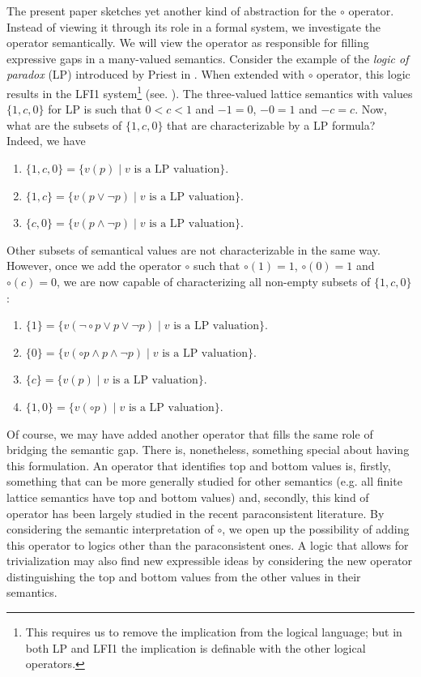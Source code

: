 \documentclass{amsart}
\begin{document}
The present paper sketches yet another kind of abstraction for the $\circ$ operator. Instead of viewing it through its role in a formal system, we investigate the operator semantically. We will view the operator as responsible for filling expressive gaps in a many-valued semantics.
Consider the example of the \textit{logic of paradox} (LP) introduced by Priest in \cite{priest_logic_1979}. When extended with $\circ$ operator, this logic results in the LFI1 system\footnote{This requires us to remove the implication from the logical language; but in both LP and LFI1 the implication is definable with the other logical operators.}  (see. \cite[p. 158-167]{carnielli_paraconsistent_2016}). The three-valued lattice semantics with values $\{1,c,0\}$ for LP is such that $0 < c < 1$ and $-1 = 0$, $-0 = 1$ and $-c = c$. Now, what are the subsets of $\{1,c,0\}$ that are characterizable by a LP formula? Indeed, we have
\begin{enumerate}
    \item $\{1,c,0\} = \{v(p) \mid v \text{ is a LP valuation}\}$.
    \item $\{1,c\} = \{v(p \lor \lnot p) \mid v \text{ is a LP valuation}\}$.
    \item $\{c, 0\} = \{v(p \land \lnot p) \mid v \text{ is a LP valuation}\}$.
\end{enumerate}
Other subsets of semantical values are not characterizable in the same way. However, once we add the operator $\circ$ such that $\circ (1) = 1$, $\circ (0) = 1$ and $\circ (c) = 0$, we are now capable of characterizing all non-empty subsets of $\{1, c, 0\}$:
\begin{enumerate}
    \item $\{1\} = \{v(\lnot \circ p \lor p \lor \lnot p) \mid v \text{ is a LP valuation}\}$.
    \item $\{0\} = \{v(\circ p \land p \land \lnot p) \mid v \text{ is a LP valuation}\}$.
    \item $\{c\} = \{v(p) \mid v \text{ is a LP valuation}\}$.
    \item $\{1,0\} = \{v(\circ p) \mid v \text{ is a LP valuation}\}$.
\end{enumerate}
Of course, we may have added another operator that fills the same role of bridging the semantic gap. There is, nonetheless, something special about having this formulation. An operator that identifies top and bottom values is, firstly, something that can be more generally studied for other semantics (e.g. all finite lattice semantics have top and bottom values) and, secondly, this kind of operator has been largely studied in the recent paraconsistent literature. By considering the semantic interpretation of $\circ$, we open up the possibility of adding this operator to logics other than the paraconsistent ones. A logic that allows for trivialization may also find new expressible ideas by considering the new operator distinguishing the top and bottom values from the other values in their semantics.
\end{document}
